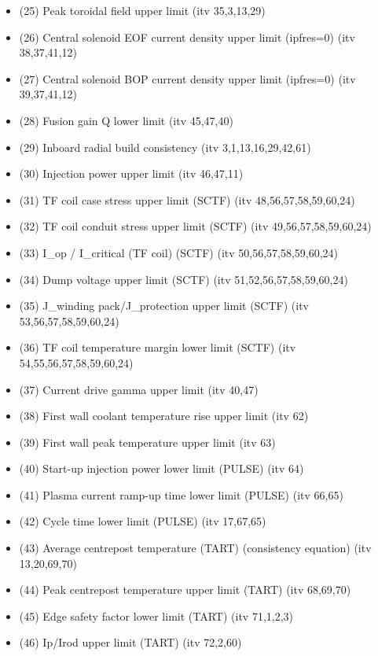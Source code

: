 \documentclass[]{article}
\begin{document}
\begin{itemize}
\begin{itemize}
    (24) Beta upper limit (itv 36,1,2,3,4,6,18)
  \item
    (25) Peak toroidal field upper limit (itv 35,3,13,29)
  \item
    (26) Central solenoid EOF current density upper limit (ipfres=0)
    (itv 38,37,41,12)
  \item
    (27) Central solenoid BOP current density upper limit (ipfres=0)
    (itv 39,37,41,12)
  \item
    (28) Fusion gain Q lower limit (itv 45,47,40)
  \item
    (29) Inboard radial build consistency (itv 3,1,13,16,29,42,61)
  \item
    (30) Injection power upper limit (itv 46,47,11)
  \item
    (31) TF coil case stress upper limit (SCTF) (itv
    48,56,57,58,59,60,24)
  \item
    (32) TF coil conduit stress upper limit (SCTF) (itv
    49,56,57,58,59,60,24)
  \item
    (33) I\_op / I\_critical (TF coil) (SCTF) (itv 50,56,57,58,59,60,24)
  \item
    (34) Dump voltage upper limit (SCTF) (itv 51,52,56,57,58,59,60,24)
  \item
    (35) J\_winding pack/J\_protection upper limit (SCTF) (itv
    53,56,57,58,59,60,24)
  \item
    (36) TF coil temperature margin lower limit (SCTF) (itv
    54,55,56,57,58,59,60,24)
  \item
    (37) Current drive gamma upper limit (itv 40,47)
  \item
    (38) First wall coolant temperature rise upper limit (itv 62)
  \item
    (39) First wall peak temperature upper limit (itv 63)
  \item
    (40) Start-up injection power lower limit (PULSE) (itv 64)
  \item
    (41) Plasma current ramp-up time lower limit (PULSE) (itv 66,65)
  \item
    (42) Cycle time lower limit (PULSE) (itv 17,67,65)
  \item
    (43) Average centrepost temperature (TART) (consistency equation)
    (itv 13,20,69,70)
  \item
    (44) Peak centrepost temperature upper limit (TART) (itv 68,69,70)
  \item
    (45) Edge safety factor lower limit (TART) (itv 71,1,2,3)
  \item
    (46) Ip/Irod upper limit (TART) (itv 72,2,60)

\end{itemize}
\end{itemize}
\end{document}
